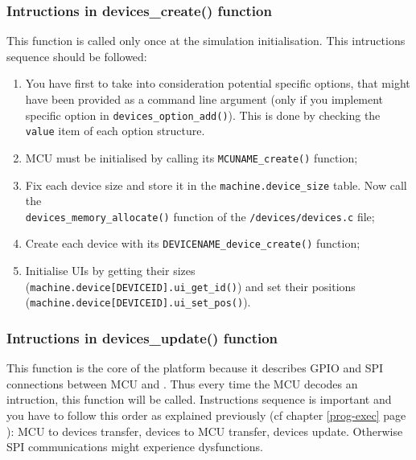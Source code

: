 \documentclass[a4paper,10pt]{report}
\begin{document}
\subsubsection{Intructions in devices\_create() function}
This function is called only once at the simulation initialisation. This intructions sequence should be followed:
\begin{enumerate}
  \item You have first to take into consideration potential specific options, that might have been provided as a command line argument (only if you implement specific option in \verb$devices_option_add()$). This is done by checking the \verb$value$ item of each option structure.
  \item MCU must be initialised by calling its \verb$MCUNAME_create()$ function;
  \item Fix each device size and store it in the \verb$machine.device_size$ table. Now call the \\ \verb$devices_memory_allocate()$ function of the \verb$/devices/devices.c$ file;
  \item Create each device with its \verb$DEVICENAME_device_create()$ function;
  \item Initialise UIs by getting their sizes (\verb$machine.device[DEVICEID].ui_get_id()$) and set their positions (\verb$machine.device[DEVICEID].ui_set_pos()$).
\end{enumerate}

\subsubsection{Intructions in devices\_update() function}
\label{platform-update}
This function is the core of the platform because it describes GPIO and SPI connections between MCU and . Thus every time the MCU decodes an intruction, this function will be called.
Instructions sequence is important and you have to follow this order as explained previously (cf chapter \ref{prog-exec} page \pageref{prog-exec}): MCU to devices transfer, devices to MCU transfer, devices update. Otherwise SPI communications might experience dysfunctions.
\end{document}
